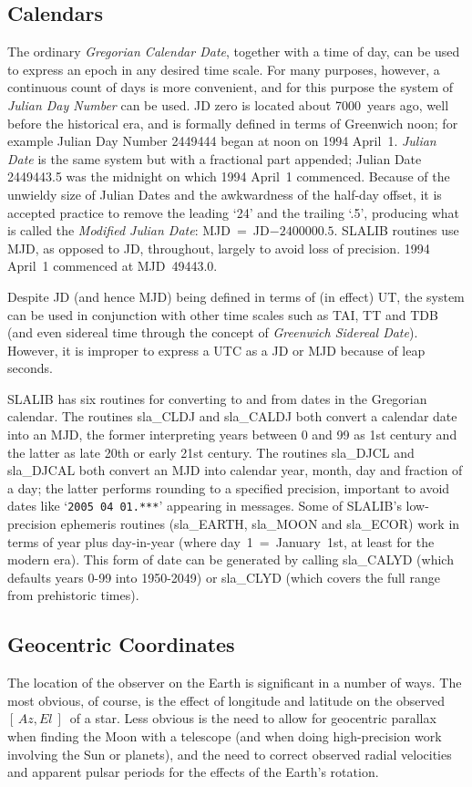 \documentclass[11pt,twoside,nolof]{starlink}
\providecommand{\azel}      {$[\,Az,El~]$}
\begin{document}
\subsection{Calendars}
The ordinary \textit{Gregorian Calendar Date},
together with a time of day, can be
used to express an epoch in any desired time scale.  For many purposes,
however, a continuous count of days is more convenient, and for
this purpose the system of \textit{Julian Day Number}\/ can be used.
JD zero is located about 7000~years ago, well before the
historical era, and is formally defined in terms of Greenwich noon;
for example Julian Day Number 2449444 began at noon
on 1994 April~1.  \textit{Julian Date}\/
is the same system but with a fractional part appended;
Julian Date 2449443.5 was the midnight on which 1994 April~1
commenced.  Because of the unwieldy size of Julian Dates
and the awkwardness of the half-day offset, it is
accepted practice to remove the leading `24' and the trailing `.5',
producing what is called the \textit{Modified Julian Date}:
MJD~=~JD$-2400000.5$.  SLALIB routines use MJD, as opposed to
JD, throughout, largely to avoid loss of precision.
1994 April~1 commenced at MJD~49443.0.

Despite JD (and hence MJD) being defined in terms of (in effect)
UT, the system can be used in conjunction with other time scales
such as TAI, TT and TDB (and even sidereal time through the
concept of \textit{Greenwich Sidereal Date}).  However, it is improper
to express a UTC as a JD or MJD because of leap seconds.

SLALIB has six routines for converting to and from dates in
the Gregorian calendar.  The routines
sla\_CLDJ
and
sla\_CALDJ
both convert a calendar date into an MJD, the former interpreting
years between 0 and 99 as 1st century and the latter as late 20th or
early 21st century.  The routines sla\_DJCL
and
sla\_DJCAL
both convert an MJD into calendar year, month, day and fraction of a day;
the latter performs rounding to a specified precision, important
to avoid dates like `\texttt{2005 04 01.***}' appearing in messages.
Some of SLALIB's low-precision ephemeris routines
(sla\_EARTH,
sla\_MOON
and
sla\_ECOR)
work in terms of year plus day-in-year (where
day~1~=~January~1st, at least for the modern era).
This form of date can be generated by
calling
sla\_CALYD
(which defaults years 0-99 into 1950-2049)
or
sla\_CLYD
(which covers the full range from prehistoric times).

\subsection{Geocentric Coordinates}
The location of the observer on the Earth is significant in a
number of ways.  The most obvious, of course, is the effect of
longitude and latitude
on the observed \azel\ of a star.  Less obvious is the need to
allow for geocentric parallax when finding the Moon with a
telescope (and when doing high-precision work involving the
Sun or planets), and the need to correct observed radial
velocities and apparent pulsar periods for the effects
of the Earth's rotation.
\end{document}
